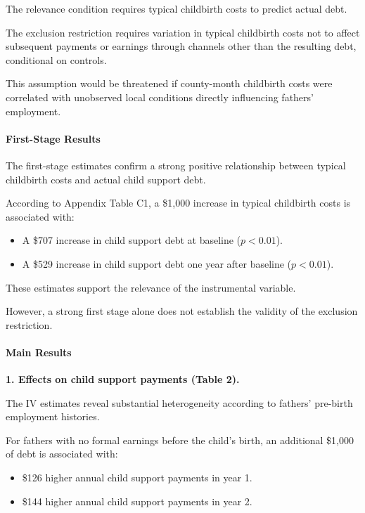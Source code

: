 \documentclass{article}
\begin{document}
The relevance condition requires typical
childbirth costs to predict actual debt.

The exclusion restriction requires
variation in typical childbirth costs
not to affect subsequent payments or
earnings through channels other than
the resulting debt, conditional on controls.

This assumption would be threatened
if county-month childbirth costs
were correlated with unobserved local
conditions directly influencing
fathers' employment.

\paragraph{First-Stage Results}

The first-stage estimates confirm a
strong positive relationship between
typical childbirth costs and actual
child support debt.

According to Appendix Table C1,
a \$1,000 increase in typical childbirth
costs is associated with:

\begin{itemize}

    \item A \$707 increase in child
    support debt at baseline
    ($p<0.01$).

    \item A \$529 increase in child
    support debt one year after
    baseline ($p<0.01$).

\end{itemize}

These estimates support the relevance
of the instrumental variable.

However, a strong first stage alone
does not establish the validity
of the exclusion restriction.

\paragraph{Main Results}

\textbf{1. Effects on child support payments
(Table 2).}

The IV estimates reveal substantial
heterogeneity according to fathers'
pre-birth employment histories.

For fathers with no formal earnings
before the child's birth, an additional
\$1,000 of debt is associated with:

\begin{itemize}

    \item \$126 higher annual child
    support payments in year 1.

    \item \$144 higher annual child
    support payments in year 2.

\end{itemize}
\end{document}
